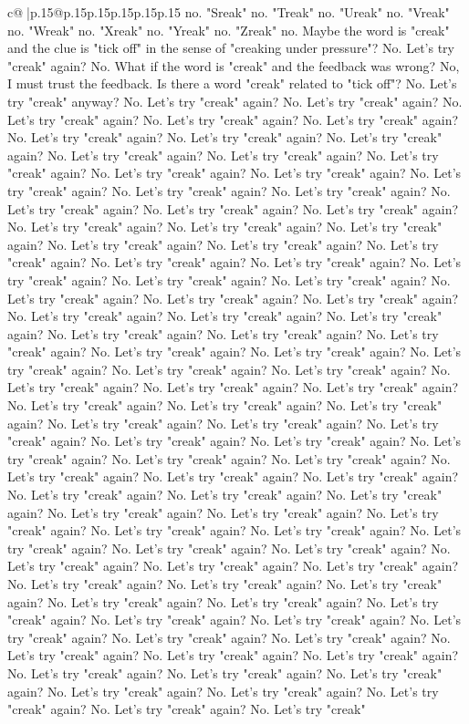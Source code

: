 \documentclass{article}
\begin{document}
{\begin{supertabular}{c@{$\;$}|p{.15\linewidth}@{}p{.15\linewidth}p{.15\linewidth}p{.15\linewidth}p{.15\linewidth}p{.15\linewidth}}
{{{no. "Sreak" no. "Treak" no. "Ureak" no. "Vreak" no. "Wreak" no. "Xreak" no. "Yreak" no. "Zreak" no. Maybe the word is "creak" and the clue is "tick off" in the sense of "creaking under pressure"? No. Let's try "creak" again? No. What if the word is "creak" and the feedback was wrong? No, I must trust the feedback. Is there a word "creak" related to "tick off"? No. Let's try "creak" anyway? No. Let's try "creak" again? No. Let's try "creak" again? No. Let's try "creak" again? No. Let's try "creak" again? No. Let's try "creak" again? No. Let's try "creak" again? No. Let's try "creak" again? No. Let's try "creak" again? No. Let's try "creak" again? No. Let's try "creak" again? No. Let's try "creak" again? No. Let's try "creak" again? No. Let's try "creak" again? No. Let's try "creak" again? No. Let's try "creak" again? No. Let's try "creak" again? No. Let's try "creak" again? No. Let's try "creak" again? No. Let's try "creak" again? No. Let's try "creak" again? No. Let's try "creak" again? No. Let's try "creak" again? No. Let's try "creak" again? No. Let's try "creak" again? No. Let's try "creak" again? No. Let's try "creak" again? No. Let's try "creak" again? No. Let's try "creak" again? No. Let's try "creak" again? No. Let's try "creak" again? No. Let's try "creak" again? No. Let's try "creak" again? No. Let's try "creak" again? No. Let's try "creak" again? No. Let's try "creak" again? No. Let's try "creak" again? No. Let's try "creak" again? No. Let's try "creak" again? No. Let's try "creak" again? No. Let's try "creak" again? No. Let's try "creak" again? No. Let's try "creak" again? No. Let's try "creak" again? No. Let's try "creak" again? No. Let's try "creak" again? No. Let's try "creak" again? No. Let's try "creak" again? No. Let's try "creak" again? No. Let's try "creak" again? No. Let's try "creak" again? No. Let's try "creak" again? No. Let's try "creak" again? No. Let's try "creak" again? No. Let's try "creak" again? No. Let's try "creak" again? No. Let's try "creak" again? No. Let's try "creak" again? No. Let's try "creak" again? No. Let's try "creak" again? No. Let's try "creak" again? No. Let's try "creak" again? No. Let's try "creak" again? No. Let's try "creak" again? No. Let's try "creak" again? No. Let's try "creak" again? No. Let's try "creak" again? No. Let's try "creak" again? No. Let's try "creak" again? No. Let's try "creak" again? No. Let's try "creak" again? No. Let's try "creak" again? No. Let's try "creak" again? No. Let's try "creak" again? No. Let's try "creak" again? No. Let's try "creak" again? No. Let's try "creak" again? No. Let's try "creak" again? No. Let's try "creak" again? No. Let's try "creak" again? No. Let's try "creak" again? No. Let's try "creak" again? No. Let's try "creak" again? No. Let's try "creak" again? No. Let's try "creak" again? No. Let's try "creak" again? No. Let's try "creak" again? No. Let's try "creak" again? No. Let's try "creak" again? No. Let's try "creak" again? No. Let's try "creak" again? No. Let's try "creak" again? No. Let's try "creak" again? No. Let's try "creak" again? No. Let's try "creak" again? No. Let's try "creak" again? No. Let's try "creak" again? No. Let's try "creak" }}}
\end{supertabular}}
\end{document}
